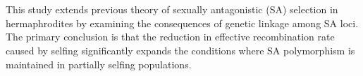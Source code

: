 \documentclass[11pt]{article}
\begin{document}




\section*{}

This study extends previous theory of sexually antagonistic (SA) selection in hermaphrodites by examining the consequences of genetic linkage among SA loci. The primary conclusion is that the reduction in effective recombination rate caused by selfing significantly expands the conditions where SA polymorphism is maintained in partially selfing populations.

\end{document}
